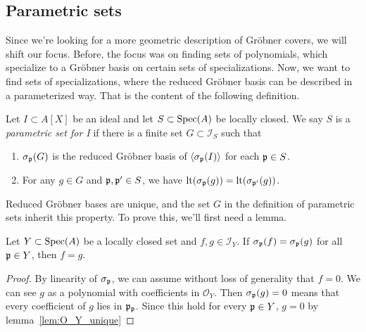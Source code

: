 \subsection{Parametric sets}
Since we're looking for a more geometric description of Gröbner covers, we will shift our focus. Before, the focus was on finding sets of polynomials, which specialize to a Gröbner basis on certain sets of specializations. Now, we want to find sets of specializations, where the reduced Gröbner basis can be described in a parameterized way. That is the content of the following definition.

\begin{definition}
  Let $I \subset A[X]$ be an ideal and let $S \subset \operatorname{Spec}(A)$ be locally closed. We say $S$ is a \textit{parametric set for I} if there is a finite set $G \subset \mathcal I_{S}$ such that
  \begin{enumerate}
    \item $\sigma_{\mathfrak p}(G)$ is the reduced Gröbner basis of $\langle \sigma_{\mathfrak p}(I) \rangle$ for each $\mathfrak p \in S$.
    \item For any $g \in G$ and $\mathfrak p, \mathfrak p' \in S$, we have $\operatorname{lt}(\sigma_{\mathfrak p}(g)) = \operatorname{lt}(\sigma_{\mathfrak p'}(g))$.
  \end{enumerate}
\end{definition}

Reduced Gröbner bases are unique, and the set $G$ in the definition of parametric sets inherit this property. To prove this, we'll first need a lemma.

\begin{lemma}\label{lem:parametric_grb_unique}
  Let $Y \subset \operatorname{Spec}(A)$ be a locally closed set and $f, g \in \mathcal I_{Y}$. If $\sigma_{\mathfrak p}(f) = \sigma_{\mathfrak p}(g)$ for all $\mathfrak p \in Y$, then $f = g$.
\end{lemma}
\begin{proof}
  By linearity of $\sigma_{\mathfrak p}$, we can assume without loss of generality that $f = 0$. We can see $g$ as a polynomial with coefficients in $\mathcal O_{Y}$. Then $\sigma_{\mathfrak p}(g) = 0$ means that every coefficient of $g$ lies in $\mathfrak p_{\mathfrak p}$. Since this hold for every $\mathfrak p \in Y$, $g = 0$ by lemma~\ref{lem:O_Y_unique}
\end{proof}

